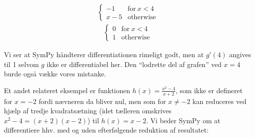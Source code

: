 \documentclass[letterpaper,10pt,english]{jupyterBook}
\begin{document}
\begin{sphinxVerbatim}[commandchars=\\\{\}]
         

   

   
         
\end{sphinxVerbatim}
\begin{equation*}
\begin{split}\displaystyle \begin{cases} -1 & \text{for}\: x < 4 \\x - 5 & \text{otherwise} \end{cases}\end{split}
\end{equation*}\begin{equation*}
\begin{split}\displaystyle \begin{cases} 0 & \text{for}\: x < 4 \\1 & \text{otherwise} \end{cases}\end{split}
\end{equation*}
\noindent{}

Vi ser at SymPy håndterer differentiationen rimeligt godt, men at \(g'(4)\) angives til 1 selvom \(g\) ikke er differentiabel her. Den “lodrette del af grafen” ved \(x=4\) burde også vække vores mistanke.

Et andet relateret eksempel er funktionen \(h(x) = \frac{x^2-4}{x+2}\), som ikke er defineret for \(x=-2\) fordi nævneren da bliver nul, men som for \(x\neq-2\) kan reduceres ved hjælp af tredje kvadratsætning (idet tælleren omskrives \(x^2-4 = (x+2)(x-2)\)) til \(h(x) = x-2\). Vi beder SymPy om at differentiere hhv. med og uden efterfølgende reduktion af resultatet:
\end{document}
